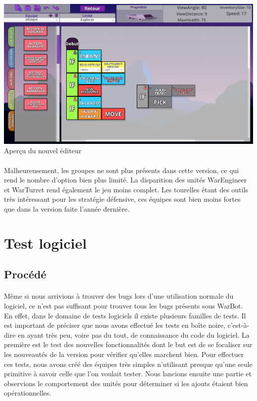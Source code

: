 \documentclass{report}
\begin{document}
\paragraph{}
\begin{adjustwidth}{-5.5em}{-5.5em}
\begin{center}
\includegraphics[scale=0.35]{DATA/editeurNew.png}
 {Aperçu du nouvel éditeur}
\end{center}
\end{adjustwidth}
\paragraph{}

Malheureusement, les groupes ne sont plus présents dans cette version, ce qui rend le nombre d’option bien plus limité.\newline
La disparition des unités WarEngineer et WarTurret rend également le jeu moins complet. Les tourelles étant des outils très intéressant pour les stratégie défensive, ces équipes sont bien moins fortes que dans la version faite l’année dernière.
\section{Test logiciel}
\subsection{Procédé}
\paragraph{}

Même si nous arrivions à trouver des bugs lors d’une utilisation normale du logiciel, ce n’est pas suffisant pour trouver tous les bugs présents sous WarBot. \newline
En effet, dans le domaine de tests logiciels il existe plusieurs familles de tests. Il est important de préciser que nous avons effectué les tests en boîte noire, c’est-à-dire en ayant très peu, voire pas du tout, de connaissance du code du logiciel. La première est le test des nouvelles fonctionnalités dont le but est de se focaliser sur les nouveautés de la version pour vérifier qu’elles marchent bien. Pour effectuer ces tests, nous avons créé des équipes très simples n’utilisant presque qu’une seule primitive à savoir celle que l’on voulait tester. Nous lancions ensuite une partie et observions le comportement des unités pour déterminer si les ajouts étaient bien opérationnelles.
\end{document}
